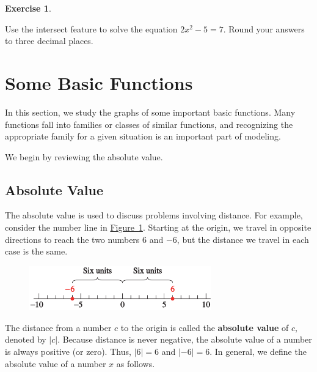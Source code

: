 \documentclass[10pt,]{book}
\newcommand{\terminology}[1]{\textbf{#1}}
\theoremstyle{plain}
\theoremstyle{definition}
\newtheorem{exercise}[theorem]{Exercise}
\theoremstyle{definition}
\numberwithin{equation}{section}
\newcommand\abs[1]{\left|#1\right|}
\begin{document}
\begin{exercise}\label{exercise-GC-nonlinear}

    Use the intersect feature to solve the equation \(2x^2 − 5 = 7\). Round your answers to three decimal places.
\end{exercise}
\typeout{************************************************}
\typeout{************************************************}
\section[Some Basic Functions]{Some Basic Functions}\label{basic-functions}

    In this section, we study the graphs of some important basic functions. Many functions fall into families or classes of similar functions, and recognizing the appropriate family for a given situation is an important part of modeling.
%
\par

    We begin by reviewing the absolute value.
%
\typeout{************************************************}
\typeout{************************************************}
\subsection[Absolute Value]{Absolute Value}\label{subsection-37}

    The absolute value is used to discuss problems involving distance. For example, consider the number line in \hyperref[fig-abs-six]{Figure~\ref{fig-abs-six}}. Starting at the origin, we travel in opposite directions to reach the two numbers \(6\) and \(−6\), but the distance we travel in each case is the same.
%
\leavevmode%
\begin{figure}
\centering
\includegraphics[width=0.70\textwidth,]{images/fig-abs-six.svg}\caption{\label{fig-abs-six}}
\end{figure}
\par

    The distance from a number \(c\) to the origin is called the \terminology{absolute value} of \(c\), denoted by \(\abs{c}\). Because distance is never negative, the absolute value of a number is always positive (or zero). Thus, \(\abs{6}= 6\) and \(\abs{−6} = 6\). In general, we define the absolute value of a number \(x\) as follows.
%
\typeout{************************************************}
\typeout{************************************************}
\end{document}

